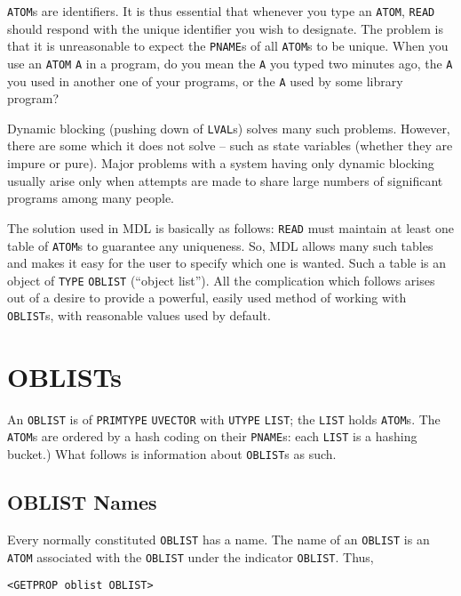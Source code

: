 \documentclass[a4paper]{scrbook}
\begin{document}
\texttt{ATOM}s are identifiers. It is thus essential that whenever you type an \texttt{ATOM}, \texttt{READ} should respond
with the unique identifier you wish to designate. The problem is that it is unreasonable to expect the \texttt{PNAME}s of
all \texttt{ATOM}s to be unique. When you use an \texttt{ATOM} \texttt{A} in a program, do you mean the \texttt{A} you
typed two minutes ago, the \texttt{A} you used in another one of your programs, or the \texttt{A} used by some library
program?

Dynamic blocking (pushing down of \texttt{LVAL}s) solves many such problems. However, there are some which it does not
solve -- such as state variables (whether they are impure or pure). Major problems with a system having only dynamic
blocking usually arise only when attempts are made to share large numbers of significant programs among many people.

The solution used in MDL is basically as follows: \texttt{READ} must maintain at least one table of \texttt{ATOM}s to
guarantee any uniqueness. So, MDL allows many such tables and makes it easy for the user to specify which one is wanted.
Such a table is an object of \texttt{TYPE} \texttt{OBLIST} (``object list''). All the complication which follows arises out
of a desire to provide a powerful, easily used method of working with \texttt{OBLIST}s, with reasonable values used by
default.

\section{OBLISTs}\label{oblists}

An \texttt{OBLIST} is of \texttt{PRIMTYPE} \texttt{UVECTOR} with \texttt{UTYPE} \texttt{LIST}; the \texttt{LIST} holds
\texttt{ATOM}s. The \texttt{ATOM}s are ordered by a hash coding on their \texttt{PNAME}s: each \texttt{LIST} is a hashing
bucket.) What follows is information about \texttt{OBLIST}s as such.

\subsection{OBLIST Names}\label{oblist-names}

 Every normally constituted \texttt{OBLIST} has a name. The name of an \texttt{OBLIST} is an
\texttt{ATOM} associated with the \texttt{OBLIST} under the indicator \texttt{OBLIST}. Thus,

\begin{verbatim}
<GETPROP oblist OBLIST>
\end{verbatim}
\end{document}
